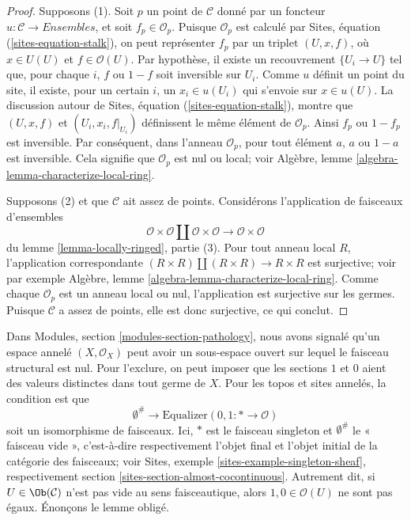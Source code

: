 \begin{proof}
Supposons (1). Soit $p$ un point de $\mathcal{C}$ donné par un foncteur
$u : \mathcal{C} \to \textit{Ensembles}$, et soit $f_p \in \mathcal{O}_p$.
Puisque $\mathcal{O}_p$ est calculé par Sites, équation
(\ref{sites-equation-stalk}), on peut représenter $f_p$ par un triplet
$(U, x, f)$, où $x \in U(U)$ et $f \in \mathcal{O}(U)$. Par hypothèse, il existe
un recouvrement $\{U_i \to U\}$ tel que, pour chaque $i$, $f$ ou $1 - f$ soit
inversible sur $U_i$. Comme $u$ définit un point du site, il existe, pour un
certain $i$, un $x_i \in u(U_i)$ qui s'envoie sur $x \in u(U)$. La discussion
autour de Sites, équation (\ref{sites-equation-stalk}), montre que $(U, x, f)$ et
$(U_i, x_i, f|_{U_i})$ définissent le même élément de $\mathcal{O}_p$. Ainsi
$f_p$ ou $1 - f_p$ est inversible. Par conséquent, dans l'anneau
$\mathcal{O}_p$, pour tout élément $a$, $a$ ou $1 - a$ est inversible. Cela
signifie que $\mathcal{O}_p$ est nul ou local; voir Algèbre,
lemme \ref{algebra-lemma-characterize-local-ring}.

\medskip\noindent
Supposons (2) et que $\mathcal{C}$ ait assez de points. Considérons
l'application de faisceaux d'ensembles
$$
\mathcal{O} \times \mathcal{O} \amalg \mathcal{O} \times \mathcal{O}
\longrightarrow
\mathcal{O} \times \mathcal{O}
$$
du lemme \ref{lemma-locally-ringed}, partie (3). Pour tout anneau local $R$,
l'application correspondante
$(R \times R) \amalg (R \times R) \to R \times R$
est surjective; voir par exemple Algèbre,
lemme \ref{algebra-lemma-characterize-local-ring}. Comme chaque
$\mathcal{O}_p$ est un anneau local ou nul, l'application est surjective sur
les germes. Puisque $\mathcal{C}$ a assez de points, elle est donc surjective,
ce qui conclut.
\end{proof}

\noindent
Dans Modules, section \ref{modules-section-pathology}, nous avons signalé
qu'un espace annelé $(X, \mathcal{O}_X)$ peut avoir un sous-espace ouvert sur
lequel le faisceau structural est nul. Pour l'exclure, on peut imposer que les
sections $1$ et $0$ aient des valeurs distinctes dans tout germe de $X$.
Pour les topos et sites annelés, la condition est que
\begin{equation}
\label{equation-one-is-never-zero}
\emptyset^\# \longrightarrow
\text{Equalizer}(0, 1 : * \longrightarrow \mathcal{O})
\end{equation}
soit un isomorphisme de faisceaux. Ici, $*$ est le faisceau singleton et
$\emptyset^\#$ le « faisceau vide », c'est-à-dire respectivement l'objet final
et l'objet initial de la catégorie des faisceaux; voir Sites,
exemple \ref{sites-example-singleton-sheaf}, respectivement
section \ref{sites-section-almost-cocontinuous}. Autrement dit, si
$U \in \Ob(\mathcal{C})$ n'est pas vide au sens faisceautique, alors
$1, 0 \in \mathcal{O}(U)$ ne sont pas égaux. Énonçons le lemme obligé.

